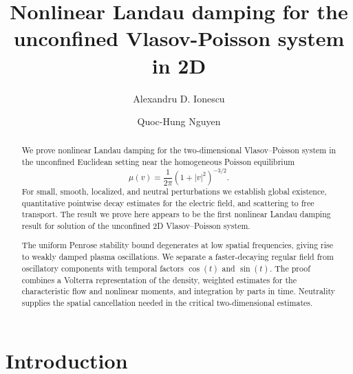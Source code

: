 \documentclass[reqno,11pt]{amsart}
\numberwithin{equation}{section}
\begin{document}
	
	\title{Nonlinear Landau damping for the unconfined Vlasov-Poisson system in 2D}
	
	\author{Alexandru D. Ionescu}
	\address{Princeton University}
	
	\author{Quoc-Hung Nguyen}
	\address{State Key Laboratory of Mathematical Sciences, Academy of Mathematics and Systems Science, Chinese Academy of Sciences, Beijing 100190, China; Institute of Mathematics, Academy of Mathematics and Systems Science, the Chinese Academy of Sciences, Beijing 100190, China}
	
	\maketitle

	\begin{abstract}
		We prove nonlinear Landau damping for the two-dimensional Vlasov--Poisson system in the unconfined Euclidean setting near the homogeneous Poisson equilibrium
	\[
	\mu(v)=\frac{1}{2\pi}(1+|v|^2)^{-3/2}.
	\]
	For small, smooth, localized, and neutral perturbations we establish global existence, quantitative pointwise decay estimates for the electric field, and scattering to free transport. The result we prove here appears to be the first nonlinear Landau damping result for solution of the unconfined 2D Vlasov--Poisson system.
	
	The uniform Penrose stability bound degenerates at low spatial frequencies, giving rise to weakly damped plasma oscillations. We separate a faster-decaying regular field from oscillatory components with temporal factors $\cos(t)$ and $\sin(t)$. The proof combines a Volterra representation of the density, weighted estimates for the characteristic flow and nonlinear moments, and integration by parts in time. Neutrality supplies the spatial cancellation needed in the critical two-dimensional estimates.
	\end{abstract}
	

	
	\setcounter{tocdepth}{1}
	
	
	\tableofcontents
	
\section{Introduction}
\end{document}

